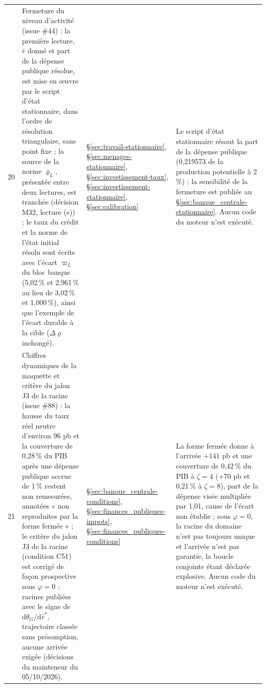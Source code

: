 \documentclass[11pt,a4paper]{article}
\begin{document}
\begin{center}
\begin{longtable}{p{0.5cm}>{\raggedright\arraybackslash}p{6.3cm}>{\raggedright\arraybackslash}p{2.1cm}>{\raggedright\arraybackslash}p{5.8cm}}
20 & Fermeture du niveau d'activité (issue \#44) : la première lecture, $\bar r$ donné et part de la dépense publique résolue, est mise en œuvre par le script d'état stationnaire, dans l'ordre de résolution triangulaire, sans point fixe ; la source de la norme $\bar\varrho_L$, présentée entre deux lectures, est tranchée (décision M32, lecture (e)) ; le taux du crédit et la norme de l'état initial résolu sont écrits avec l'écart $\varpi_L$ du bloc banque (5,02\,\% et 2,961\,\% au lieu de 3,02\,\% et 1,000\,\%), ainsi que l'exemple de l'écart durable à la cible ($\Delta\varrho$ inchangé). & \S\ref{sec:travail-stationnaire}, \S\ref{sec:menages-stationnaire}, \S\ref{sec:investissement-taux}, \S\ref{sec:investissement-stationnaire}, \S\ref{sec:calibration} & Le script d'état stationnaire résout la part de la dépense publique (0,219573 de la production potentielle à 2\,\%) ; la sensibilité de la fermeture est publiée au \S\ref{sec:banque_centrale-stationnaire}. Aucun code du moteur n'est exécuté.\\
21 & Chiffres dynamiques de la maquette et critère du jalon J3 de la racine (issue \#88) : la hausse du taux réel neutre d'environ 96 pb et la couverture de 0,28\,\% du PIB après une dépense publique accrue de 1\,\% restent non remesurées, annotées « non reproduites par la forme fermée » ; le critère du jalon J3 de la racine (condition C51) est corrigé de façon prospective sous $\varphi = 0$ : racines publiées avec le signe de $\mathrm{d}\theta_G/\mathrm{d}\hat r^\ast$, trajectoire classée sans présomption, aucune arrivée exigée (décisions du mainteneur du 05/10/2026). & \S\ref{sec:banque_centrale-conditions}, \S\ref{sec:finances_publiques-impots}, \S\ref{sec:finances_publiques-conditions} & La forme fermée donne à l'arrivée $+141$ pb et une couverture de 0,42\,\% du PIB à $\zeta = 4$ ($+70$ pb et 0,21\,\% à $\zeta = 8$), part de la dépense visée multipliée par 1,01, cause de l'écart non établie ; sous $\varphi = 0$, la racine du domaine n'est pas toujours unique et l'arrivée n'est pas garantie, la boucle conjointe étant déclarée explosive. Aucun code du moteur n'est exécuté.\\

\end{longtable}
\end{center}
\end{document}

